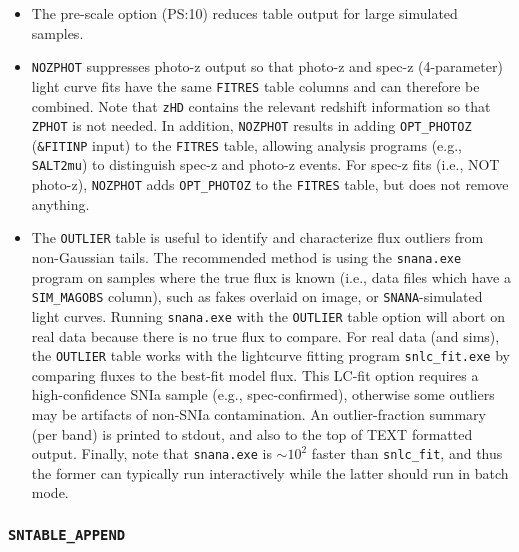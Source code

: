 \documentclass[12pt]{article}
\newcommand{\SNANA}{{\tt SNANA}}
\begin{document}
{\begin{itemize}
includes scalars (CID,MJD,BAND,TOBS,etc) and a model spectrum
(flux vs. wavelength).
The {\tt MODELSPEC} table may be useful for calibration 
corrections that require an SED. To save storage, each spectrum 
is stored within the wavelength range defined by the passband.
%
\item
The pre-scale option (PS:10) reduces table output for large
simulated samples.
%
\item
{\tt NOZPHOT} suppresses photo-z output so that photo-z and spec-z 
(4-parameter) light curve fits have the same {\tt FITRES} table columns 
and can therefore be combined. Note that {\tt zHD} contains the 
relevant redshift information so that {\tt ZPHOT} is not needed. 
In addition, {\tt NOZPHOT} results in adding {\tt OPT\_PHOTOZ} 
({\tt \&FITINP} input) to the {\tt FITRES} table,
allowing analysis programs (e.g., {\tt SALT2mu})
to distinguish spec-z and photo-z events.
For spec-z fits (i.e., NOT photo-z),  
{\tt NOZPHOT} adds {\tt OPT\_PHOTOZ} to the {\tt FITRES} table,
but does not remove anything.
%
\item The {\tt OUTLIER} table is useful to identify and characterize
flux outliers from non-Gaussian tails. The recommended method is using
the {\tt snana.exe} program on samples where the true flux is known
(i.e., data files which have a {\tt SIM\_MAGOBS} column), 
such as fakes overlaid on image, or {\SNANA}-simulated light curves. 
Running {\tt snana.exe} with the {\tt OUTLIER} table option will 
abort on real data because there is no true flux to compare.
For real data (and sims), the {\tt OUTLIER} table works with the
lightcurve fitting program {\tt snlc\_fit.exe} by comparing fluxes to 
the best-fit model flux. This LC-fit option requires a high-confidence 
SNIa sample (e.g., spec-confirmed),
otherwise some outliers may be artifacts of non-SNIa contamination.
An outlier-fraction summary (per band) is printed to stdout,
and also to the top of TEXT formatted output.
Finally, note that {\tt snana.exe} is $\sim 10^2$ faster than {\tt snlc\_fit},
and thus the former can typically run interactively while the latter
should run in batch mode.
\end{itemize}

  \subsubsection{{\tt SNTABLE\_APPEND} }
  \label{sss:sntable_append}

}
\end{document}
